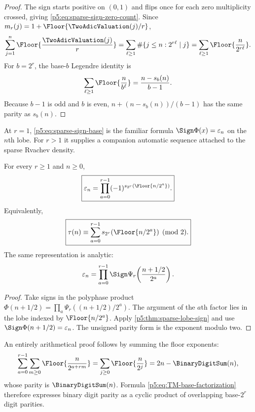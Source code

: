 \documentclass[11pt]{article}
\theoremstyle{definition}
\theoremstyle{remark}
\newcommand{\eps}{\varepsilon}
\begin{document}
\begin{proof}
The sign starts positive on $(0,1)$ and flips once for each zero multiplicity
crossed, giving \eqref{p5:eq:sparse-sign-zero-count}.  Since
$m_r(j)=1+\Floor{\TwoAdicValuation(j)/r}$,
\[
 \sum_{j=1}^{n}\Floor{\frac{\TwoAdicValuation(j)}r}
 =\sum_{\ell\ge1}\#\{j\le n:2^{r\ell}\mid j\}
 =\sum_{\ell\ge1}\Floor{\frac n{2^{r\ell}}}.
\]
For $b=2^r$, the base-$b$ Legendre identity is
\[
 \sum_{\ell\ge1}\Floor{\frac n{b^\ell}}
 =\frac{n-s_b(n)}{b-1}.
\]
Because $b-1$ is odd and $b$ is even,
$n+(n-s_b(n))/(b-1)$ has the same parity as $s_b(n)$.
\end{proof}

At $r=1$, \eqref{p5:eq:sparse-sign-base} is the familiar formula
$\Sign\Phi(x)=\eps_n$ on the $n$th lobe.  For $r>1$ it supplies a companion
automatic sequence attached to the sparse Rvachev density.

\begin{corollary}
\label{p5:cor:TM-base-factorization}
For every $r\ge1$ and $n\ge0$,
\begin{equation}
 \boxed{\displaystyle
 \eps_n
 =\prod_{a=0}^{r-1}(-1)^{s_{2^r}(\Floor{n/2^a})}.} \label{p5:eq:TM-base-factorization}
\end{equation}
Equivalently,
\begin{equation}
 \boxed{\displaystyle
 \tau(n)\equiv
 \sum_{a=0}^{r-1}s_{2^r}(\Floor{n/2^a})\pmod2.}   \label{p5:eq:TM-base-parity}
\end{equation}
The same representation is analytic:
\begin{equation}
 \eps_n
 =\prod_{a=0}^{r-1}
   \Sign\Psi_r\!\left(\frac{n+1/2}{2^a}\right).           \label{p5:eq:TM-sparse-lobe-product}
\end{equation}
\end{corollary}

\begin{proof}
Take signs in the polyphase product
$\Phi(n+1/2)=\prod_a\Psi_r((n+1/2)/2^a)$.  The argument of the $a$th factor
lies in the lobe indexed by $\Floor{n/2^a}$.  Apply
\cref{p5:thm:sparse-lobe-sign} and use
$\Sign\Phi(n+1/2)=\eps_n$.  The unsigned parity form is the exponent modulo two.
\end{proof}

An entirely arithmetical proof follows by summing the floor exponents:
\begin{equation}
 \sum_{a=0}^{r-1}\sum_{m\ge0}
 \Floor{\frac{n}{2^{a+rm}}}
 =\sum_{j\ge0}\Floor{\frac{n}{2^j}}
 =2n-\BinaryDigitSum(n),                                               \label{p5:eq:floor-polyphase-TM}
\end{equation}
whose parity is $\BinaryDigitSum(n)$.  Formula
\eqref{p5:eq:TM-base-factorization} therefore expresses binary digit parity as a
cyclic product of overlapping base-$2^r$ digit parities.
\end{document}
